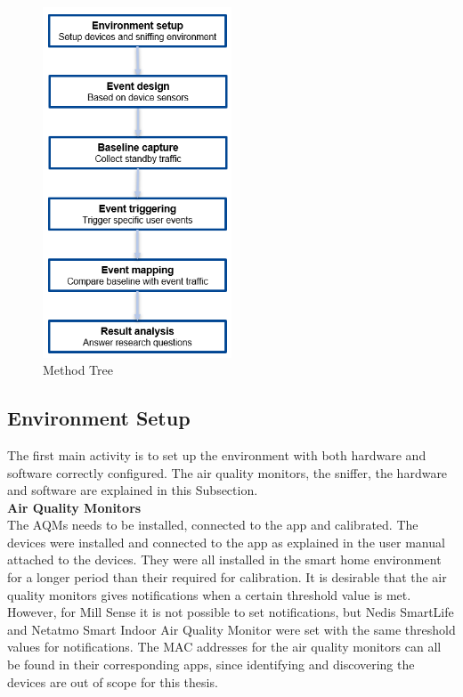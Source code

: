 \begin{figure} [H]
    \centering
    \includegraphics[width=0.5\textwidth]{figures/MethodTree.png}
    \caption{Method Tree}
    \label{fig:MethodTree}
\end{figure}
\subsection{Environment Setup}
The first main activity is to set up the environment with both hardware and software correctly configured. The air quality monitors, the sniffer, the hardware and software are explained in this Subsection. 
\\
\textbf{Air Quality Monitors}\\
The \gls{AQM}s needs to be installed, connected to the app and calibrated. The devices were installed and connected to the app as explained in the user manual attached to the devices. They were all installed in the smart home environment for a longer period than their required for calibration. It is desirable that the air quality monitors gives notifications when a certain threshold value is met. However, for Mill Sense it is not possible to set notifications, but Nedis SmartLife and Netatmo Smart Indoor Air Quality Monitor were set with the same threshold values for notifications. The \gls{MAC} addresses for the air quality monitors can all be found in their corresponding apps, since identifying and discovering the devices are out of scope for this thesis. 

